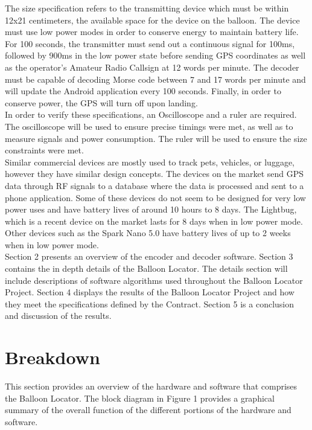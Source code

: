\documentclass[12pt, letterpaper]{article}
\begin{document}
The size specification refers to the transmitting device which must be within 12x21 centimeters, the available space for the device on the balloon. The device must use low power modes in order to conserve energy to maintain battery life. For 100 seconds, the transmitter must send out a continuous signal for 100ms, followed by 900ms in the low power state before sending GPS coordinates as well as the operator's Amateur Radio Callsign at 12 words per minute. The decoder must be capable of decoding Morse code between 7 and 17 words per minute and will update the Android application every 100 seconds. Finally, in order to conserve power, the GPS will turn off upon landing. \\ 

In order to verify these specifications, an Oscilloscope and a ruler are required. The oscilloscope will be used to ensure precise timings were met, as well as to measure signals and power consumption. The ruler will be used to ensure the size constraints were met.\\ 

Similar commercial devices are mostly used to track pets, vehicles, or luggage, however they have similar design concepts. The devices on the market send GPS data through RF signals to a database where the data is processed and sent to a phone application. Some of these devices do not seem to be designed for very low power uses and have battery lives of around 10 hours to 8 days. The Lightbug, which is a recent device on the market lasts for 8 days when in low power mode. Other devices such as the Spark Nano 5.0 have battery lives of up to 2 weeks when in low power mode.\\

Section 2 presents an overview of the encoder and decoder software. Section 3 contains the in depth details of the Balloon Locator. The details section will include descriptions of software algorithms used throughout the Balloon Locator Project. Section 4 displays the results of the Balloon Locator Project and how they meet the specifications defined by the Contract. Section 5 is a conclusion and discussion of the results.

\section{Breakdown}

This section provides an overview of the hardware and software that comprises the Balloon Locator. The block diagram in Figure 1 provides a graphical summary of the overall function of the different portions of the hardware and software.
\end{document}
